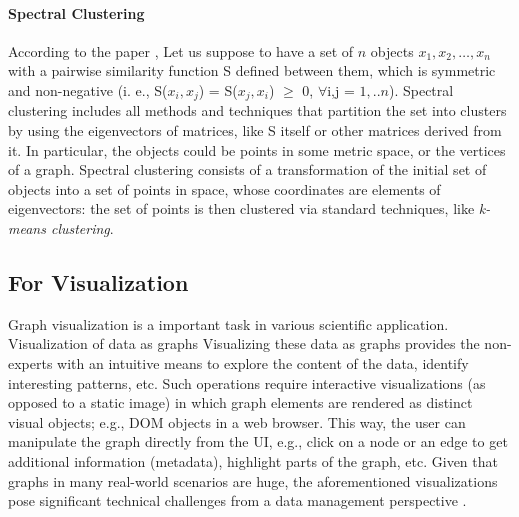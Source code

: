 \paragraph{Spectral Clustering}
According to the paper \cite{communitypaper}, Let us suppose to have a set of $n$ objects $x_1 , x_2 , \ldots , x_n$
with a pairwise similarity function S defined between
them, which is symmetric and non-negative (i. e.,
S($x_i , x_j$) = S($x_j , x_i$) $\geq$ 0, $\forall$i,j = $1, ..n$). Spectral clustering includes all methods and techniques that partition
the set into clusters by using the eigenvectors of matrices,
like S itself or other matrices derived from it. In particular, the objects could be points in some metric space,
or the vertices of a graph. Spectral clustering consists of
a transformation of the initial set of objects into a set of
points in space, whose coordinates are elements of eigenvectors: the set of points is then clustered via standard
techniques, like \textit{k-means clustering}.

\subsection{For  Visualization}
Graph visualization is a important task in various scientific application. Visualization of data as graphs Visualizing these data
as graphs provides the non-experts with an intuitive means
to explore the content of the data, identify interesting patterns,
etc. Such operations require interactive visualizations
(as opposed to a static image) in which graph elements are
rendered as distinct visual objects; e.g., DOM objects in a
web browser. This way, the user can manipulate the graph
directly from the UI, e.g., click on a node or an edge to
get additional information (metadata), highlight parts of the
graph, etc. Given that graphs in many real-world scenarios
are huge, the aforementioned visualizations pose significant
technical challenges from a data management perspective \cite{graphviz}.

